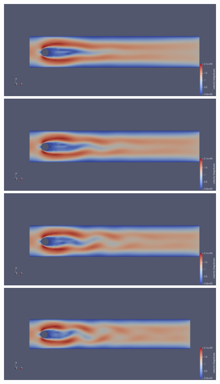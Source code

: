 \documentclass[12pt]{article}
\numberwithin{equation}{section}
\begin{document}
\begin{figure}[H]
\centering
\includegraphics[scale=.2]{EMAC_time_2.png}
\includegraphics[scale=.2]{EMAC_time_2_5.png}
\includegraphics[scale=.2]{EMAC_time_3.png}
\includegraphics[scale=.2]{EMAC_time_3_5.png}
\end{figure}
\end{document}
